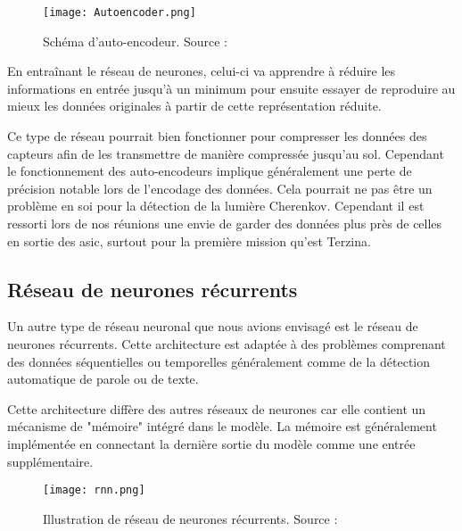 \begin{figure}[tbph!]
	\centering
	\texttt{[image: Autoencoder.png]}
	\caption[Schéma d'auto-encodeur]{Schéma d'auto-encodeur. Source : \cite{Autoencoder}}
\end{figure}

En entraînant le réseau de neurones, celui-ci va apprendre à réduire les informations en entrée jusqu'à un minimum pour 
ensuite essayer de reproduire au mieux les données originales à partir de cette représentation réduite.

Ce type de réseau pourrait bien fonctionner pour compresser les données des capteurs afin de les transmettre de manière compressée jusqu'au sol.
Cependant le fonctionnement des auto-encodeurs implique généralement une perte de précision notable lors de l'encodage des données.
Cela pourrait ne pas être un problème en soi pour la détection de la lumière Cherenkov. Cependant il est ressorti lors de nos réunions
une envie de garder des données plus près de celles en sortie des \gls{asic}, surtout pour la première mission qu'est Terzina.

\subsection{Réseau de neurones récurrents}
Un autre type de réseau neuronal que nous avions envisagé est le réseau de neurones récurrents. Cette architecture est adaptée
à des problèmes comprenant des données séquentielles ou temporelles généralement comme de la détection automatique de parole ou de texte.

Cette architecture diffère des autres réseaux de neurones car elle contient un mécanisme de "mémoire" intégré dans le modèle.
La mémoire est généralement implémentée en connectant la dernière sortie du modèle comme une entrée supplémentaire.

\begin{figure}[tbph!]
	\centering
	\texttt{[image: rnn.png]}
	\caption[Illustration de réseau de neurones récurrents]{Illustration de réseau de neurones récurrents. Source : \cite{RnnImage}}
\end{figure}


